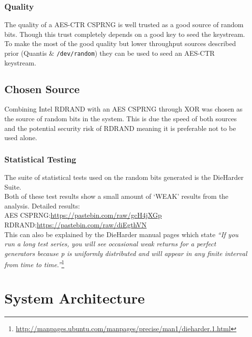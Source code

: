 \documentclass{paper}
\begin{document}
			\subsubsection{Quality}
				The quality of a AES-CTR CSPRNG is well trusted as a good source of random bits. Though this trust completely depends on a good key to seed the keystream.\\
				To make the most of the good quality but lower throughput sources described prior (Quantis \& \texttt{/dev/random}) they can be used to seed an AES-CTR keystream.\\
			
		\subsection{Chosen Source}
			Combining Intel RDRAND with an AES CSPRNG through XOR was chosen as the source of random bits in the system. This is due the speed of both sources and the potential security risk of RDRAND meaning it is preferable not to be used alone.
			\subsubsection{Statistical Testing}
			The suite of statistical tests used on the random bits generated is the DieHarder Suite.\\  
			Both of these test results show a small amount of `WEAK' results from the analysis. Detailed results:\\ 
			AES CSPRNG:\url{https://pastebin.com/raw/gcH4jXGp}\\ RDRAND:\url{https://pastebin.com/raw/diEgthVN}\\
			This can also be explained by the DieHarder manual pages which state \textit{``If you run a long test series, you will see occasional weak returns for a perfect generators because p is uniformly distributed and will appear in any finite interval from time to time.''}\footnote{\url{http://manpages.ubuntu.com/manpages/precise/man1/dieharder.1.html}}
		
		\section{System Architecture}
\end{document}
